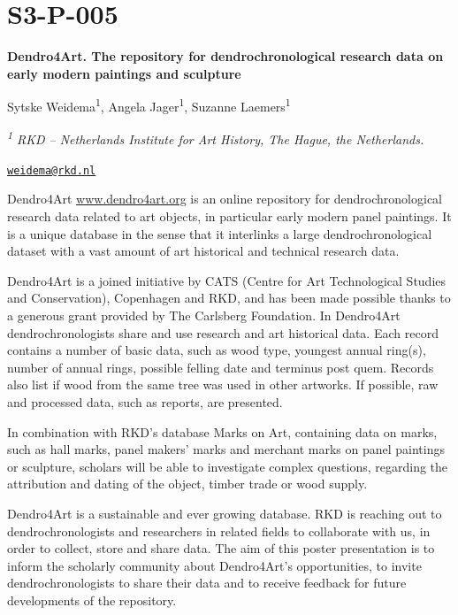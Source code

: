 \documentclass[
]{book}
\begin{document}
\hypertarget{s3-p-005}{%
\section*{S3-P-005}\label{s3-p-005}}

\textbf{Dendro4Art. The repository for dendrochronological research data on early modern paintings and sculpture}

Sytske Weidema\textsuperscript{1}, Angela Jager\textsuperscript{1}, Suzanne Laemers\textsuperscript{1}

\emph{\textsuperscript{1} RKD -- Netherlands Institute for Art History, The Hague, the Netherlands.}

\href{mailto:weidema@rkd.nl}{\nolinkurl{weidema@rkd.nl}}

Dendro4Art \href{http://www.dendro4art.org}{www.dendro4art.org} is an online repository for dendrochronological research data related to art objects, in particular early modern panel paintings. It is a unique database in the sense that it interlinks a large dendrochronological dataset with a vast amount of art historical and technical research data.

Dendro4Art is a joined initiative by CATS (Centre for Art Technological Studies and Conservation), Copenhagen and RKD, and has been made possible thanks to a generous grant provided by The Carlsberg Foundation. In Dendro4Art dendrochronologists share and use research and art historical data. Each record contains a number of basic data, such as wood type, youngest annual ring(s), number of annual rings, possible felling date and terminus post quem. Records also list if wood from the same tree was used in other artworks. If possible, raw and processed data, such as reports, are presented.

In combination with RKD's database Marks on Art, containing data on marks, such as hall marks, panel makers' marks and merchant marks on panel paintings or sculpture, scholars will be able to investigate complex questions, regarding the attribution and dating of the object, timber trade or wood supply.

Dendro4Art is a sustainable and ever growing database. RKD is reaching out to dendrochronologists and researchers in related fields to collaborate with us, in order to collect, store and share data. The aim of this poster presentation is to inform the scholarly community about Dendro4Art's opportunities, to invite dendrochronologists to share their data and to receive feedback for future developments of the repository.
\end{document}

